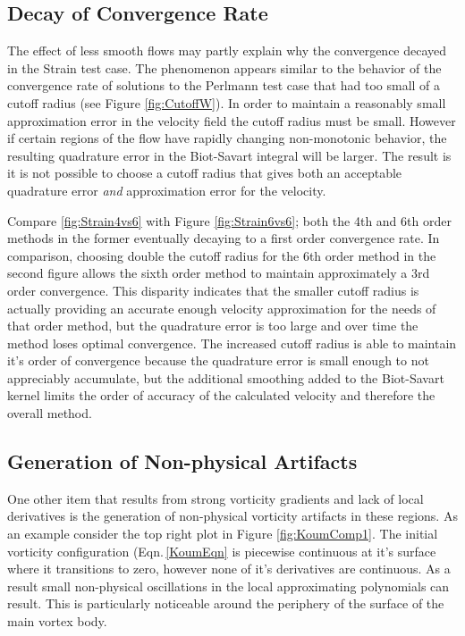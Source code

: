 \documentclass[letterpaper,12pt]{report}
\begin{document}
\subsection{Decay of Convergence Rate}\label{Decay}
The effect of less smooth flows may partly explain why the convergence decayed in the Strain test case. The phenomenon appears similar to the behavior of the convergence rate of solutions to the Perlmann test case that had too small of a cutoff radius (see Figure \ref{fig:CutoffW}). In order to maintain a reasonably small approximation error in the velocity field the cutoff radius must be small. However if certain regions of the flow have rapidly changing non-monotonic behavior, the resulting quadrature error in the Biot-Savart integral will be larger. The result is it is not possible to choose a cutoff radius that gives both an acceptable quadrature error \textit{and} approximation error for the velocity.

Compare \ref{fig:Strain4vs6} with Figure \ref{fig:Strain6vs6}; both the 4th and 6th order methods in the former eventually decaying to a first order convergence rate. In comparison, choosing double the cutoff radius for the 6th order method in the second figure allows the sixth order method to maintain approximately a 3rd order convergence. This disparity indicates that the smaller cutoff radius is actually providing an accurate enough velocity approximation for the needs of that order method, but the quadrature error is too large and over time the method loses optimal convergence. The increased cutoff radius is able to maintain it's order of convergence because the quadrature error is small enough to not appreciably accumulate, but the additional smoothing added to the Biot-Savart kernel limits the order of accuracy of the calculated velocity and therefore the overall method.

\subsection{Generation of Non-physical Artifacts}
One other item that results from strong vorticity gradients and lack of local derivatives is the generation of non-physical vorticity artifacts in these regions. As an example consider the top right plot in Figure \ref{fig:KoumComp1}. The initial vorticity configuration (Eqn.\,\eqref{KoumEqn} is piecewise continuous at it's surface where it transitions to zero, however none of it's derivatives are continuous. As a result small non-physical oscillations in the local approximating polynomials can result. This is particularly noticeable around the periphery of the surface of the main vortex body.
\end{document}
